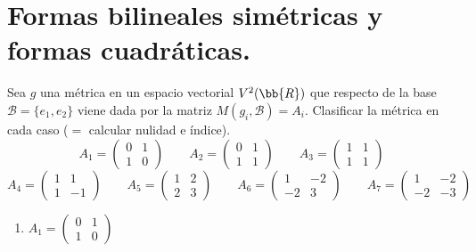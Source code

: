 \section{Formas bilineales simétricas y formas cuadráticas.}
\label{sec:EjerciciosTema2}
\begin{ejercicio}\label{Ej1}
    Sea $g$ una métrica en un espacio vectorial $V^2(\bb{R})$ que respecto de la base $\mathcal{B} = \{e_1, e_2\}$ viene dada por la matriz $M(g_i, \mathcal{B}) = A_i$. Clasificar la métrica en cada caso ($=$ calcular nulidad e índice).
    \begin{equation*}
        A_1=\left(\begin{array}{cc}
            0 & 1 \\
            1 & 0
        \end{array} \right) \qquad
        A_2=\left(\begin{array}{cc}
            0 & 1 \\
            1 & 1
        \end{array} \right) \qquad
        A_3=\left(\begin{array}{cc}
            1 & 1 \\
            1 & 1
        \end{array} \right)
    \end{equation*}
    \begin{equation*}
        A_4=\left(\begin{array}{cc}
            1 & 1 \\
            1 & -1
        \end{array} \right) \qquad
        A_5=\left(\begin{array}{cc}
            1 & 2 \\
            2 & 3
        \end{array} \right) \qquad
        A_6=\left(\begin{array}{cc}
            1 & -2 \\
            -2 & 3
        \end{array} \right) \qquad
        A_7=\left(\begin{array}{cc}
            1 & -2 \\
            -2 & -3
        \end{array} \right)
    \end{equation*}

    \begin{enumerate}
        \item $A_1=\left(\begin{array}{cc}
            0 & 1 \\
            1 & 0
        \end{array} \right)$
        

\end{enumerate}
\end{ejercicio}
